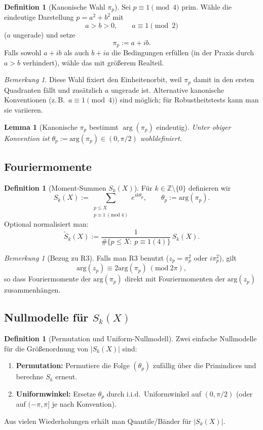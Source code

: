 \documentclass[a4paper,11pt]{article}
\newtheorem{lemma}[satz]{Lemma}
\theoremstyle{definition}
\newtheorem{definition}[satz]{Definition}
\theoremstyle{remark}
\newtheorem{bemerkung}[satz]{Bemerkung}
\newcommand{\Z}{\mathbb{Z}}
\newcommand{\Arg}{\mathrm{arg}}
\begin{document}
	\begin{definition}[Kanonische Wahl \(\pi_p\)]
		Sei \(p\equiv 1\pmod 4\) prim. Wähle die eindeutige Darstellung \(p=a^2+b^2\) mit
		\[
		a>b>0,\qquad a\equiv 1\pmod 2
		\]
		(\(a\) ungerade) und setze
		\[
		\pi_p := a+ib.
		\]
		Falls sowohl \(a+ib\) als auch \(b+ia\) die Bedingungen erfüllen (in der Praxis durch \(a>b\) verhindert), wähle das mit größerem Realteil.
	\end{definition}
	
	\begin{bemerkung}
		Diese Wahl fixiert den Einheitenorbit, weil \(\pi_p\) damit in den ersten Quadranten fällt und zusätzlich \(a\) ungerade ist.
		Alternative kanonische Konventionen (z.\,B.\ \(a\equiv 1\pmod 4\)) sind möglich; für Robustheitstests kann man sie variieren.
	\end{bemerkung}
	
	\begin{lemma}[Kanonische \(\pi_p\) bestimmt \(\arg(\pi_p)\) eindeutig]
		Unter obiger Konvention ist \(\theta_p:=\Arg(\pi_p)\in(0,\pi/2)\) wohldefiniert.
	\end{lemma}
	
	\subsection{Fouriermomente}
	\begin{definition}[Moment-Summen \(S_k(X)\)]
		Für \(k\in\Z\setminus\{0\}\) definieren wir
		\[
		S_k(X):=\sum_{\substack{p\le X\\ p\equiv 1\ (\mathrm{mod}\ 4)}} e^{ik\theta_p},
		\qquad \theta_p:=\Arg(\pi_p).
		\]
		Optional normalisiert man:
		\[
		\widetilde S_k(X):=\frac{1}{\#\{p\le X:\ p\equiv 1(4)\}}\, S_k(X).
		\]
	\end{definition}
	
	\begin{bemerkung}[Bezug zu R3]
		Falls man R3 benutzt (\(z_p=\pi_p^2\) oder \(i\pi_p^2\)), gilt
		\[
		\Arg(z_p) \equiv 2\Arg(\pi_p)\ (\mathrm{mod}\ 2\pi),
		\]
		so dass Fouriermomente der \(\Arg(\pi_p)\) direkt mit Fouriermomenten der \(\Arg(z_p)\) zusammenhängen.
	\end{bemerkung}
	
	\subsection{Nullmodelle für \(S_k(X)\)}
	\begin{definition}[Permutation und Uniform-Nullmodell]
		Zwei einfache Nullmodelle für die Größenordnung von \(|S_k(X)|\) sind:
		\begin{enumerate}
			\item \textbf{Permutation:} Permutiere die Folge \((\theta_{p})\) zufällig über die Primindices und berechne \(S_k\) erneut.
			\item \textbf{Uniformwinkel:} Ersetze \(\theta_p\) durch i.i.d.\ Uniformwinkel auf \((0,\pi/2)\) (oder auf \((-\pi,\pi]\) je nach Konvention).
		\end{enumerate}
		Aus vielen Wiederholungen erhält man Quantile/Bänder für \(|S_k(X)|\).
	\end{definition}
	
\end{document}
